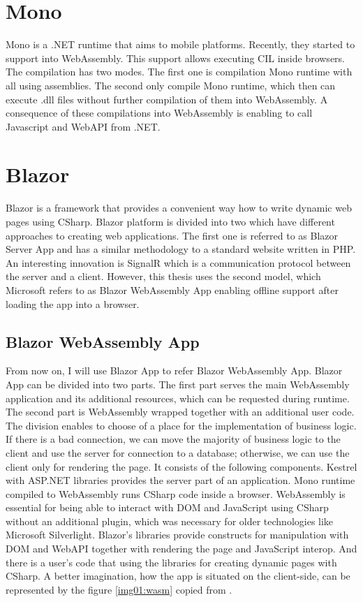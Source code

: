 \section{Mono}

Mono is a .NET runtime that aims to mobile platforms. 
Recently, they started to support \cite{compilation} into WebAssembly.
This support allows executing CIL inside browsers.
The compilation has two modes.
The first one is compilation Mono runtime with all using assemblies.
The second only compile Mono runtime, which then can execute .dll files without further compilation of them into WebAssembly.
A consequence of these compilations into WebAssembly is enabling to call Javascript and WebAPI from .NET.

\section{Blazor}

Blazor is a framework that provides a convenient way how to write dynamic web pages using CSharp.
Blazor platform is divided into two \cite{Hosting_models} which have different approaches to creating web applications. 
The first one is referred to as Blazor Server App and has a similar methodology to a standard website written in PHP.
An interesting innovation is SignalR which is a communication protocol between the server and a client.
However, this thesis uses the second model, which Microsoft refers to as Blazor WebAssembly App enabling offline support after loading the app into a browser.

\subsection{Blazor WebAssembly App}
From now on, I will use Blazor App to refer Blazor WebAssembly App.
Blazor App can be divided into two parts.
The first part serves the main WebAssembly application and its additional resources, which can be requested during runtime.
The second part is WebAssembly wrapped together with an additional user code.
The division enables to choose of a place for the implementation of business logic.
If there is a bad connection, we can move the majority of business logic to the client and use the server for connection to a database; otherwise, we can use the client only for rendering the page. It consists of the following components. 
Kestrel with ASP.NET libraries provides the server part of an application.
Mono runtime compiled to WebAssembly runs CSharp code inside a browser.
WebAssembly is essential for being able to interact with DOM and JavaScript using CSharp without an additional plugin, which was necessary for older technologies like Microsoft Silverlight.
Blazor's libraries provide constructs for manipulation with DOM and WebAPI together with rendering the page and JavaScript interop.
And there is a user's code that using the libraries for creating dynamic pages with CSharp.
A better imagination, how the app is situated on the client-side, can be represented by the figure \ref{img01:wasm} copied from \cite{Glick2018}.

